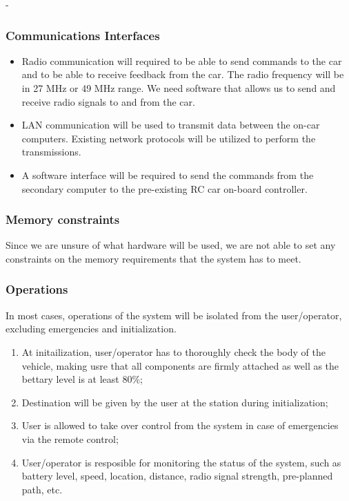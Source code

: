 -\documentclass[compsoc,draftclsnofoot,onecolumn,10pt]{IEEEtran}
\begin{document}
\subsubsection{Communications Interfaces} %
\begin{itemize}
	\item Radio communication will required to be able to send commands to the car and
	to be able to receive feedback from the car. The radio frequency will be in 27
	MHz or 49 MHz range. We need software that allows us to send and receive radio
	signals to and from the car. 
	
	\item LAN communication will be used to transmit data between the on-car computers.
	Existing network protocols will be utilized to perform the transmissions.
	
	\item A software interface will be required to send the commands from the
	secondary computer to the pre-existing RC car on-board controller.
	
\end{itemize}


\subsubsection{Memory constraints} %
Since we are unsure of what hardware will be used, we are not able to set any 
constraints on the memory requirements that the system has to meet. 

\subsubsection{Operations} %
In most cases, operations of the system will be isolated from the user/operator,
excluding emergencies and initialization.  
\begin{enumerate}
	\item At initailization, user/operator has to thoroughly check the body of the
	vehicle, making usre that all components are firmly attached as well as the 
	bettary level is at least 80\%;
	\item Destination will be given by the user at the station during initialization;
	\item User is allowed to take over control from the system in case of emergencies
	via the remote control;
	\item User/operator is resposible for monitoring the status of the system, such as 
	battery level, speed, location, distance, radio signal strength, pre-planned path, 
	etc.
\end{enumerate}
\end{document}
